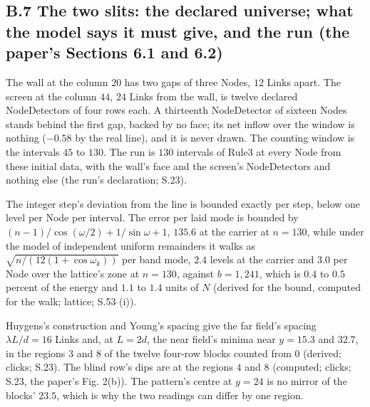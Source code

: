 \documentclass[pdflatex,sn-mathphys-num]{sn-jnl}
\theoremstyle{thmstyleone}
\begin{document}
\subsection*{B.7 The two slits: the declared universe; what the model says it must give, and the run (the paper's Sections 6.1 and 6.2)}

The wall at the column $20$ has two gaps of three Nodes, $12$ Links apart. The screen at the column $44$, $24$ Links from the wall, is twelve declared NodeDetectors of four rows each. A thirteenth NodeDetector of sixteen Nodes stands behind the first gap, backed by no face; its net inflow over the window is nothing ($-0.58$ by the real line), and it is never drawn. The counting window is the intervals $45$ to $130$. The run is $130$ intervals of Rule3 at every Node from these initial data, with the wall's face and the screen's NodeDetectors and nothing else (the run's declaration; S.23).

The integer step's deviation from the line is bounded exactly per step, below one level per Node per interval. The error per laid mode is bounded by $(n - 1) / \cos(\omega / 2) + 1 / \sin\omega + 1$, $135.6$ at the carrier at $n = 130$, while under the model of independent uniform remainders it walks as $\sqrt{n / (12(1 + \cos\omega_k))}$ per band mode, $2.4$ levels at the carrier and $3.0$ per Node over the lattice's zone at $n = 130$, against $b = 1{,}241$, which is $0.4$ to $0.5$ percent of the energy and $1.1$ to $1.4$ units of $N$ (derived for the bound, computed for the walk; lattice; S.53 (i)).

Huygens's construction and Young's spacing give the far field's spacing $\lambda L / d = 16$ Links and, at $L = 2d$, the near field's minima near $y = 15.3$ and $32.7$, in the regions $3$ and $8$ of the twelve four-row blocks counted from $0$ (derived; clicks; S.23). The blind row's dips are at the regions $4$ and $8$ (computed; clicks; S.23, the paper's Fig. 2(b)). The pattern's centre at $y = 24$ is no mirror of the blocks' $23.5$, which is why the two readings can differ by one region.
\end{document}
